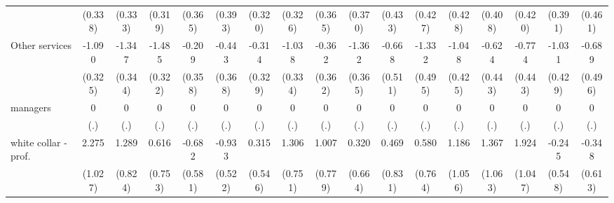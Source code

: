 {\begin{tabular}{l*{16}{c}}
                    &     (0.338)         &     (0.333)         &     (0.319)         &     (0.365)         &     (0.393)         &     (0.320)         &     (0.326)         &     (0.365)         &     (0.370)         &     (0.433)         &     (0.427)         &     (0.428)         &     (0.408)         &     (0.420)         &     (0.391)         &     (0.461)         \\
[1em]
Other services      &      -1.090\sym{***}&      -1.347\sym{***}&      -1.485\sym{***}&      -0.209         &      -0.443         &      -0.314         &      -1.038\sym{**} &      -0.362         &      -1.362\sym{***}&      -0.668         &      -1.332\sym{**} &      -1.048\sym{*}  &      -0.624         &      -0.774         &      -1.031\sym{*}  &      -0.689         \\
                    &     (0.325)         &     (0.344)         &     (0.322)         &     (0.358)         &     (0.368)         &     (0.329)         &     (0.334)         &     (0.362)         &     (0.365)         &     (0.511)         &     (0.495)         &     (0.425)         &     (0.443)         &     (0.443)         &     (0.429)         &     (0.496)         \\
[1em]
managers            &           0         &           0         &           0         &           0         &           0         &           0         &           0         &           0         &           0         &           0         &           0         &           0         &           0         &           0         &           0         &           0         \\
                    &         (.)         &         (.)         &         (.)         &         (.)         &         (.)         &         (.)         &         (.)         &         (.)         &         (.)         &         (.)         &         (.)         &         (.)         &         (.)         &         (.)         &         (.)         &         (.)         \\
[1em]
white collar - prof.&       2.275\sym{*}  &       1.289         &       0.616         &      -0.682         &      -0.933         &       0.315         &       1.306         &       1.007         &       0.320         &       0.469         &       0.580         &       1.186         &       1.367         &       1.924         &      -0.245         &      -0.348         \\
                    &     (1.027)         &     (0.824)         &     (0.753)         &     (0.581)         &     (0.522)         &     (0.546)         &     (0.751)         &     (0.779)         &     (0.664)         &     (0.831)         &     (0.764)         &     (1.056)         &     (1.063)         &     (1.047)         &     (0.548)         &     (0.613)         \\

\end{tabular}}
